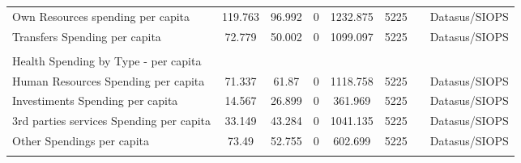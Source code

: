 \begin{table}[H]
\begin{footnotesize}
\begin{center}
{\begin{threeparttable}[b]
\begin{tabular}{rrrrrrrr}
    \multicolumn{1}{l}{Own Resources spending per capita} & \multicolumn{1}{c}{119.763} & \multicolumn{1}{c}{96.992} & \multicolumn{1}{c}{0} & \multicolumn{1}{c}{1232.875} & \multicolumn{1}{c}{5225} &       & \multicolumn{1}{c}{Datasus/SIOPS} \\
    \multicolumn{1}{l}{Transfers Spending per capita} & \multicolumn{1}{c}{72.779} & \multicolumn{1}{c}{50.002} & \multicolumn{1}{c}{0} & \multicolumn{1}{c}{1099.097} & \multicolumn{1}{c}{5225} &       & \multicolumn{1}{c}{Datasus/SIOPS} \\
          &       &       &       &       &       &       &  \\
    \multicolumn{1}{l}{Health Spending by Type - per capita} &       &       &       &       &       &       &  \\
    \multicolumn{1}{l}{Human Resources Spending per capita} & \multicolumn{1}{c}{71.337} & \multicolumn{1}{c}{61.87} & \multicolumn{1}{c}{0} & \multicolumn{1}{c}{1118.758} & \multicolumn{1}{c}{5225} &       & \multicolumn{1}{c}{Datasus/SIOPS} \\
    \multicolumn{1}{l}{Investiments Spending per capita} & \multicolumn{1}{c}{14.567} & \multicolumn{1}{c}{26.899} & \multicolumn{1}{c}{0} & \multicolumn{1}{c}{361.969} & \multicolumn{1}{c}{5225} &       & \multicolumn{1}{c}{Datasus/SIOPS} \\
    \multicolumn{1}{l}{3rd parties services Spending per capita} & \multicolumn{1}{c}{33.149} & \multicolumn{1}{c}{43.284} & \multicolumn{1}{c}{0} & \multicolumn{1}{c}{1041.135} & \multicolumn{1}{c}{5225} &       & \multicolumn{1}{c}{Datasus/SIOPS} \\
    \multicolumn{1}{l}{Other Spendings per capita} & \multicolumn{1}{c}{73.49} & \multicolumn{1}{c}{52.755} & \multicolumn{1}{c}{0} & \multicolumn{1}{c}{602.699} & \multicolumn{1}{c}{5225} &       & \multicolumn{1}{c}{Datasus/SIOPS} \\
          &       &       &       &       &       &       &  \\
    \bottomrule
    \bottomrule
    \end{tabular}%
    
  \label{table:stats}%
  
  

\end{threeparttable}
}
\end{center}
\end{footnotesize}
\end{table}

